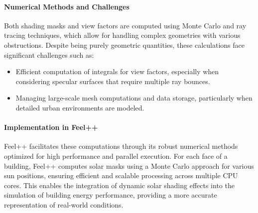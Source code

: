 \documentclass[runningheads]{llncs}
\begin{document}
\paragraph{Numerical Methods and Challenges}
Both shading masks and view factors are computed using Monte Carlo and ray tracing techniques, which allow for handling complex geometries with various obstructions. Despite being purely geometric quantities, these calculations face significant challenges such as:
\begin{itemize}
    \item Efficient computation of integrals for view factors, especially when considering specular surfaces that require multiple ray bounces.
    \item Managing large-scale mesh computations and data storage, particularly when detailed urban environments are modeled.
\end{itemize}

\paragraph{Implementation in Feel++}
Feel++ facilitates these computations through its robust numerical methods optimized for high performance and parallel execution. For each face of a building, Feel++ computes solar masks using a Monte Carlo approach for various sun positions, ensuring efficient and scalable processing across multiple CPU cores. This enables the integration of dynamic solar shading effects into the simulation of building energy performance, providing a more accurate representation of real-world conditions.
\end{document}
